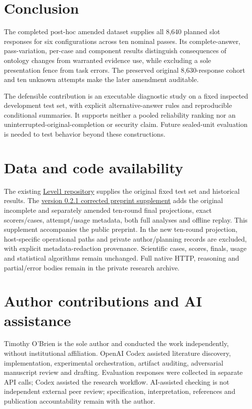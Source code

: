 \documentclass[a4paper,preprint,12pt,numbers,nopreprintline]{elsarticle}
\begin{document}
\section{Conclusion}
The completed post-hoc amended dataset supplies all 8,640 planned slot responses for six configurations across ten nominal passes. Its complete-answer, pass-variation, per-case and component results distinguish consequences of ontology changes from warranted evidence use, while excluding a sole presentation fence from task errors. The preserved original 8,630-response cohort and ten unknown attempts make the later amendment auditable.

The defensible contribution is an executable diagnostic study on a fixed inspected development test set, with explicit alternative-answer rules and reproducible conditional summaries. It supports neither a pooled reliability ranking nor an uninterrupted-original-completion or security claim. Future sealed-unit evaluation is needed to test behavior beyond these constructions.

\section*{Data and code availability}
The existing \href{https://github.com/prosessleder/semantic-epistemic-governance-level1}{Level1 repository} supplies the original fixed test set and historical results. The \href{https://github.com/prosessleder/semantic-epistemic-governance-level1/releases/tag/v0.2.1-preprint}{version 0.2.1 corrected preprint supplement} adds the original incomplete and separately amended ten-round final projections, exact scorers/cases, attempt/usage metadata, both full analyses and offline replay. This supplement accompanies the public preprint. In the new ten-round projection, host-specific operational paths and private author/planning records are excluded, with explicit metadata-redaction provenance. Scientific cases, scores, finals, usage and statistical algorithms remain unchanged. Full native HTTP, reasoning and partial/error bodies remain in the private research archive.

\section*{Author contributions and AI assistance}
Timothy O'Brien is the sole author and conducted the work independently, without institutional affiliation. OpenAI Codex assisted literature discovery, implementation, experimental orchestration, artifact auditing, adversarial manuscript review and drafting. Evaluation responses were collected in separate API calls; Codex assisted the research workflow. AI-assisted checking is not independent external peer review; specification, interpretation, references and publication accountability remain with the author.
\end{document}
